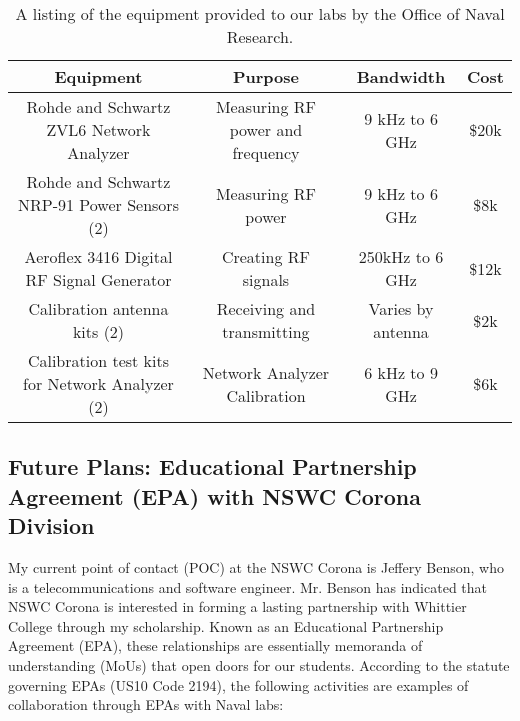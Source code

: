 \documentclass[../../../main.tex]{subfiles}
\begin{document}
\begin{table}
\centering
\begin{tabular}{c c c c}
Equipment & Purpose & Bandwidth & Cost \\ \hline
Rohde and Schwartz ZVL6 Network Analyzer & Measuring RF power and frequency & 9 kHz to 6 GHz & \$20k \\
Rohde and Schwartz NRP-91 Power Sensors (2) & Measuring RF power & 9 kHz to 6 GHz & \$8k \\
Aeroflex 3416 Digital RF Signal Generator & Creating RF signals & 250kHz to 6 GHz & \$12k \\
Calibration antenna kits (2) & Receiving and transmitting & Varies by antenna & \$2k \\
Calibration test kits for Network Analyzer (2) & Network Analyzer Calibration & 6 kHz to 9 GHz & \$6k
\end{tabular}
\caption{\label{tab:equip} A listing of the equipment provided to our labs by the Office of Naval Research.}
\end{table}

\subsection{Future Plans: Educational Partnership Agreement (EPA) with NSWC Corona Division}
\label{sec:epa}

My current point of contact (POC) at the NSWC Corona is Jeffery Benson, who is a telecommunications and software engineer.  Mr. Benson has indicated that NSWC Corona is interested in forming a lasting partnership with Whittier College through my scholarship.  Known as an Educational Partnership Agreement (EPA), these relationships are essentially memoranda of understanding (MoUs) that open doors for our students.  According to the statute governing EPAs (US10 Code 2194), the following activities are examples of collaboration through EPAs with Naval labs:
\end{document}
